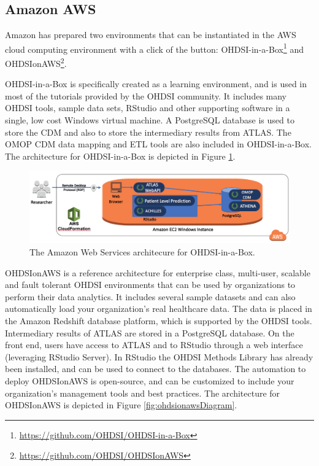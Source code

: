 \documentclass[11pt]{book}
\let\rmarkdownfootnote\footnote%
\def\footnote{\protect\rmarkdownfootnote}
\theoremstyle{definition}
\theoremstyle{definition}
\theoremstyle{definition}
\theoremstyle{remark}
\begin{document}
\hypertarget{amazon-aws}{%
\subsection{Amazon AWS}\label{amazon-aws}}

Amazon has prepared two environments that can be instantiated in the AWS cloud computing environment with a click of the button: OHDSI-in-a-Box\footnote{\url{https://github.com/OHDSI/OHDSI-in-a-Box}} and OHDSIonAWS\footnote{\url{https://github.com/OHDSI/OHDSIonAWS}}. 

OHDSI-in-a-Box is specifically created as a learning environment, and is used in most of the tutorials provided by the OHDSI community. It includes many OHDSI tools, sample data sets, RStudio and other supporting software in a single, low cost Windows virtual machine. A PostgreSQL database is used to store the CDM and also to store the intermediary results from ATLAS. The OMOP CDM data mapping and ETL tools are also included in OHDSI-in-a-Box. The architecture for OHDSI-in-a-Box is depicted in Figure \ref{fig:ohdsiinaboxDiagram}.

\begin{figure}

{\centering \includegraphics[width=1\linewidth]{images/OhdsiAnalyticsTools/OHDSI-in-a-BoxDiagram} 

}

\caption{The Amazon Web Services architecure for OHDSI-in-a-Box.}\label{fig:ohdsiinaboxDiagram}
\end{figure}

OHDSIonAWS is a reference architecture for enterprise class, multi-user, scalable and fault tolerant OHDSI environments that can be used by organizations to perform their data analytics. It includes several sample datasets and can also automatically load your organization's real healthcare data. The data is placed in the Amazon Redshift database platform, which is supported by the OHDSI tools. Intermediary results of ATLAS are stored in a PostgreSQL database. On the front end, users have access to ATLAS and to RStudio through a web interface (leveraging RStudio Server). In RStudio the OHDSI Methods Library has already been installed, and can be used to connect to the databases. The automation to deploy OHDSIonAWS is open-source, and can be customized to include your organization's management tools and best practices. The architecture for OHDSIonAWS is depicted in Figure \ref{fig:ohdsionawsDiagram}.
\end{document}
